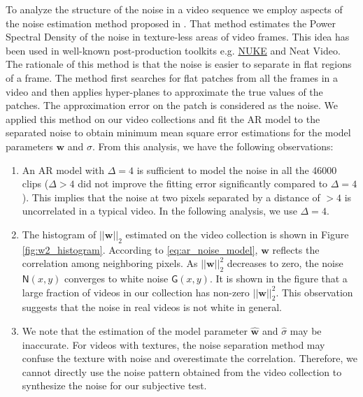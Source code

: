 \documentclass{sig-alternate}
\newcommand{\vect}[1]{\boldsymbol{#1}} %
\begin{document}
To analyze the structure of the noise in a video sequence we employ aspects of the noise estimation method proposed in \cite{KokKelDenCra2016}. That method estimates the Power Spectral Density \cite{Oppenheim1999} of the noise in texture-less areas of video frames. This idea has been used in well-known post-production toolkits e.g. \href{http://www.thefoundry.co.uk}{NUKE} and Neat Video. The rationale of this method is that the noise is easier to separate in flat regions of a frame. The method first searches for flat patches from all the frames in a video and then applies hyper-planes to approximate the true values of the patches. The approximation error on the patch is considered as the noise. We applied this method on our video collections and fit the AR model to the separated noise to obtain minimum mean square error estimations for the model parameters $\vect{w}$ and $\sigma$. From this analysis, we have the following observations:
\begin{enumerate}[leftmargin=*]
\item An AR model with $\Delta=4$ is sufficient to model the noise in all the 46000 clips ($\Delta>4$ did not improve the fitting error significantly compared to $\Delta=4$). This implies that the noise at two pixels separated by a distance of $>4$ is uncorrelated in a typical video. In the following analysis, we use $\Delta=4$.
\item The histogram of $||\vect{w}||_2$ estimated on the video collection is shown in Figure \ref{fig:w2_histogram}. According to \eqref{eq:ar_noise_model}, $\vect{w}$ reflects the correlation among neighboring pixels. As $||\vect{w}||_2^2$ decreases to zero, the noise $\mathsf{N}(x,y)$ converges to white noise $\mathsf{G}(x,y)$. It is shown in the figure that a large fraction of videos in our collection has non-zero $||\vect{w}||_2^2$. This observation suggests that the noise in real videos is not white in general.
\item We note that the estimation of the model parameter $\vect{\hat w}$ and $\hat\sigma$ may be inaccurate. For videos with textures, the noise separation method may confuse the texture with noise and overestimate the correlation. Therefore, we cannot directly use the noise pattern obtained from the video collection to synthesize the noise for our subjective test.  
\end{enumerate}
\end{document}
